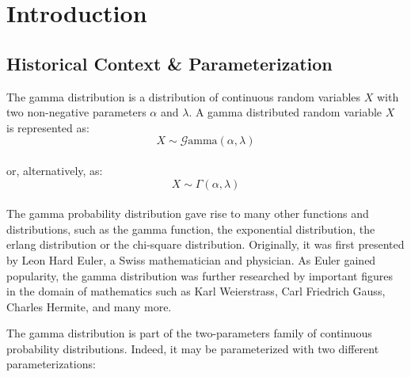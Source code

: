 \documentclass[12pt]{article}
\newcommand{\G}{\mathcal{G}}
\begin{document}
\singlespacing

\tableofcontents\pagebreak
\doublespacing
\section{Introduction}\vspace*{-24pt}
\subsection{Historical Context \& Parameterization}
The gamma distribution\cite{carrierProbabilityStatistics201BNM05} is a distribution of continuous random variables $X$
with two non-negative parameters $\alpha$ and $\lambda$. A gamma distributed random variable $X$ is represented as:
\vspace*{-24pt}
\begin{equation*}
	X\sim\G\text{amma}(\alpha, \lambda)
\end{equation*}\\[-40pt]
or, alternatively, as:\vspace*{-6pt}
\begin{equation*}
	X\sim\Gamma(\alpha,\lambda)
\end{equation*}\\[-60pt]

The gamma probability distribution gave rise to many other functions and distributions, such as the gamma function, the
exponential distribution, the erlang distribution or the chi-square distribution. Originally, it was first presented by
Leon Hard Euler, a Swiss mathematician and physician. As Euler gained popularity, the gamma distribution was further
researched by important figures in the domain of mathematics such as Karl Weierstrass, Carl Friedrich Gauss, Charles
Hermite, and many more\cite{hoschGammaDistribution2017, wikipediaGammaDistribution2022,
sebahIntroductionGammaFunction2002}.

The gamma distribution is part of the two-parameters family of continuous probability distributions. Indeed, it may be
parameterized with two different parameterizations\cite{wikipediaGammaDistribution2022}:
\end{document}
